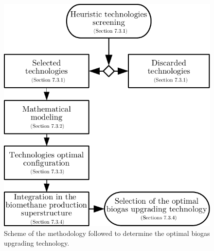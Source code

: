 \begin{refsection}[referencesCh7]
\begin{figure}[h]
	\centering
	\includegraphics[width=0.7\linewidth, trim={0cm 0cm 0cm 0cm},clip]{gfx/Chapter7/Figure1.pdf} 
	\caption{Scheme of the methodology followed to determine the optimal biogas	upgrading technology.}
	\label{fig:Fig1}
\end{figure}


\end{refsection}
